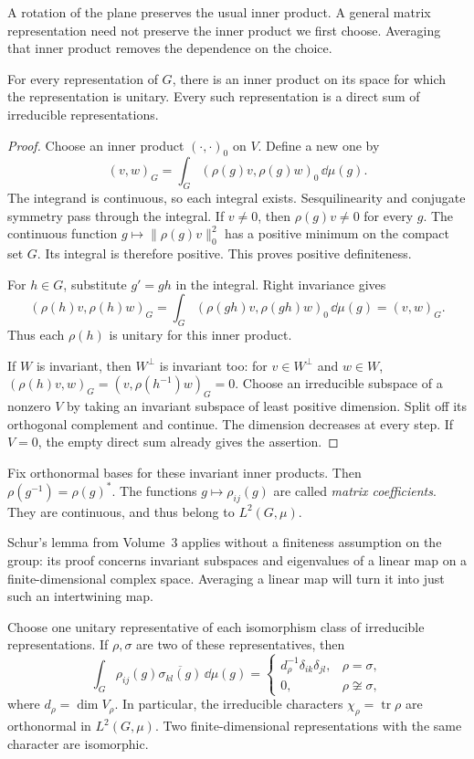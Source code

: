 A rotation of the plane preserves the usual inner product. A general matrix representation need not preserve the inner product we first choose. Averaging that inner product removes the dependence on the choice.

\begin{proposition}\label{prop:unitarytrick}
For every representation of $G$, there is an inner product on its space for which the representation is unitary. Every such representation is a direct sum of irreducible representations.
\end{proposition}

\begin{proof}
Choose an inner product $(\cdot,\cdot)_0$ on $V$. Define a new one by
\[
(v,w)_G=\int_G(\rho(g)v,\rho(g)w)_0\,\dd\mu(g).
\]
The integrand is continuous, so each integral exists. Sesquilinearity and conjugate symmetry pass through the integral. If $v\ne0$, then $\rho(g)v\ne0$ for every $g$. The continuous function $g\mapsto\|\rho(g)v\|_0^2$ has a positive minimum on the compact set $G$. Its integral is therefore positive. This proves positive definiteness.

For $h\in G$, substitute $g'=gh$ in the integral. Right invariance gives
\[
(\rho(h)v,\rho(h)w)_G
=\int_G(\rho(gh)v,\rho(gh)w)_0\,\dd\mu(g)
=(v,w)_G.
\]
Thus each $\rho(h)$ is unitary for this inner product.

If $W$ is invariant, then $W^\perp$ is invariant too: for $v\in W^\perp$ and $w\in W$,
$(\rho(h)v,w)_G=(v,\rho(h^{-1})w)_G=0$.
Choose an irreducible subspace of a nonzero $V$ by taking an invariant subspace of least positive dimension. Split off its orthogonal complement and continue. The dimension decreases at every step. If $V=0$, the empty direct sum already gives the assertion.
\end{proof}

Fix orthonormal bases for these invariant inner products. Then $\rho(g^{-1})=\rho(g)^*$. The functions $g\mapsto\rho_{ij}(g)$ are called \emph{matrix coefficients}. They are continuous, and thus belong to $L^2(G,\mu)$.

Schur's lemma from Volume~3 applies without a finiteness assumption on the group: its proof concerns invariant subspaces and eigenvalues of a linear map on a finite-dimensional complex space. Averaging a linear map will turn it into just such an intertwining map.

\begin{theorem}\label{thm:schurorth}
Choose one unitary representative of each isomorphism class of irreducible representations. If $\rho,\sigma$ are two of these representatives, then
\[
\int_G\rho_{ij}(g)\overline{\sigma_{kl}(g)}\,\dd\mu(g)
=\begin{cases}
 d_\rho^{-1}\delta_{ik}\delta_{jl},&\rho=\sigma,\\
 0,&\rho\not\cong\sigma,
\end{cases}
\]
where $d_\rho=\dim V_\rho$. In particular, the irreducible characters $\chi_\rho=\operatorname{tr}\rho$ are orthonormal in $L^2(G,\mu)$. Two finite-dimensional representations with the same character are isomorphic.
\end{theorem}

